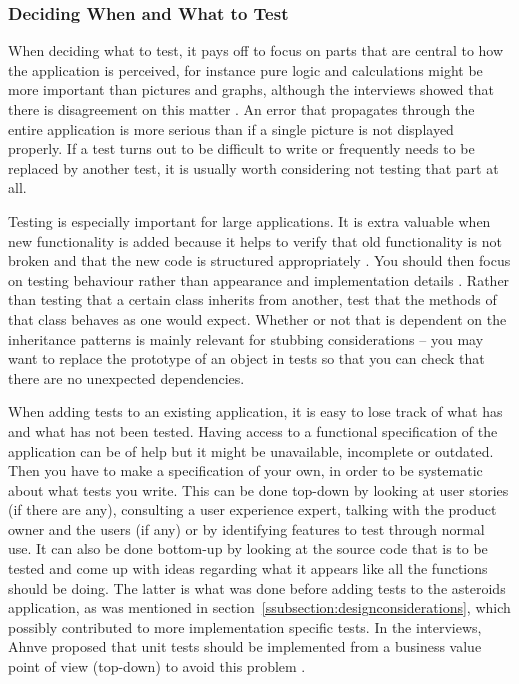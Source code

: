 \documentclass[11pt]{article}
\begin{document}
\subsubsection{Deciding When and What to Test}

When deciding what to test, it pays off to focus on parts that are central to how the application is perceived, for instance pure logic and calculations might be more important than pictures and graphs, although the interviews showed that there is disagreement on this matter \cite[question~21]{Ahnve}\cite[question~5]{Wendt}. An error that propagates through the entire application is more serious than if a single picture is not displayed properly. If a test turns out to be difficult to write or frequently needs to be replaced by another test, it is usually worth considering not testing that part at all. \cite[questions~9-10]{Edelstam}

Testing is especially important for large applications. It is extra valuable when new functionality is added because it helps to verify that old functionality is not broken and that the new code is structured appropriately \cite[questions~6-7]{Stenmark}. You should then focus on testing behaviour rather than appearance and implementation details \cite[question~10]{Edelstam}. Rather than testing that a certain class inherits from another, test that the methods of that class behaves as one would expect. Whether or not that is dependent on the inheritance patterns is mainly relevant for stubbing considerations -- you may want to replace the prototype of an object in tests so that you can check that there are no unexpected dependencies.

When adding tests to an existing application, it is easy to lose track of what has and what has not been tested. Having access to a functional specification of the application can be of help but it might be unavailable, incomplete or outdated. Then you have to make a specification of your own, in order to be systematic about what tests you write. This can be done top-down by looking at user stories (if there are any), consulting a user experience expert, talking with the product owner and the users (if any) or by identifying features to test through normal use. It can also be done bottom-up by looking at the source code that is to be tested and come up with ideas regarding what it appears like all the functions should be doing. The latter is what was done before adding tests to the asteroids application, as was mentioned in section~\ref{ssubsection:designconsiderations}, which possibly contributed to more implementation specific tests. In the interviews, Ahnve proposed that unit tests should be implemented from a business value point of view (top-down) to avoid this problem \cite[question~20]{Ahnve}.
\end{document}
